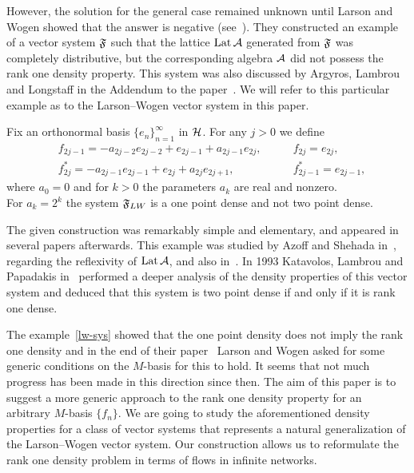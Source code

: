 \documentclass[12pt,oneside,a4paper]{amsart}
\begin{document}
  However, the solution for the general case remained unknown until Larson and Wogen showed that the answer is negative (see~\cite{larson}).
  They constructed an example of a vector system $\fsys$ such that the lattice $\lattice$ generated from $\fsys$
    was completely distributive, but the corresponding algebra $\cal{A}$
    did not possess the rank one density property.
  This system was also discussed by Argyros, Lambrou and Longstaff in the Addendum to the paper~\cite{argyroslambrou}.
  We will refer to this particular example as to the Larson--Wogen vector system in this paper.
  \begin{example}
    \label{lw-sys}
    Fix an orthonormal basis $\{e_n\}_{n=1}^\infty$ in $\cal{H}$. For any $j > 0$ we define
    \begin{align*}
      &f_{2j-1}=-a_{2j-2}e_{2j-2} + e_{2j-1} + a_{2j-1}e_{2j}, \qquad &f_{2j}=e_{2j},\\
      &f^*_{2j}=-a_{2j-1}e_{2j-1}+e_{2j}+a_{2j}e_{2j+1}, \qquad &f^*_{2j-1}=e_{2j-1},
    \end{align*}
    where $a_0 = 0$ and for $k > 0$ the parameters $a_k$ are real and nonzero.\\
    For $a_k = 2^k$ the system $\fsys_{LW}$ is a one point dense and not two point dense.
  \end{example}
  The given construction was remarkably simple and elementary, and appeared in several papers afterwards.
  This example was studied by Azoff and Shehada in~\cite{azoff}, regarding the reflexivity of $\lattice$, and also in~\cite{me}.
  In 1993 Katavolos, Lambrou and Papadakis in~\cite{katavolos} performed a deeper analysis of the density properties
    of this vector system and deduced that this system is two point dense if and only if it is rank one dense.

  The example~\ref{lw-sys} showed that the one point density does not imply the rank one density and
    in the end of their paper~\cite{larson} Larson and Wogen asked for some generic conditions on the $M$-basis
    for this to hold.
  It seems that not much progress has been made in this direction since then.
  The aim of this paper is to suggest a more generic approach to the rank one density property
    for an arbitrary $M$-basis $\{f_n\}$.
  We are going to study the aforementioned density properties for a class of vector systems that represents a natural generalization of the Larson--Wogen vector system.
  Our construction allows us to reformulate the rank one density problem in terms of flows in infinite networks.
\end{document}
